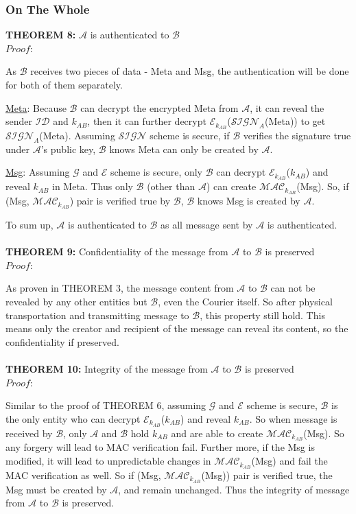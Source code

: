 \documentclass[10pt,a4paper]{article}
\begin{document}
\subsubsection*{On The Whole}
\textbf{THEOREM 8:} $\mathcal{A}$ is authenticated to $\mathcal{B}$ \\
\emph{$Proof:$} \par
As $\mathcal{B}$ receives two pieces of data - Meta and Msg, the authentication will be done for both of them separately.\par
\underline{Meta}: Because $\mathcal{B}$ can decrypt the encrypted Meta from $\mathcal{A}$, it can reveal the sender $\mathcal{ID}$ and $k_{AB}$, then it can further decrypt $\mathcal{E}_{k_{AB}}$($\mathcal{SIGN}_A$(Meta)) to get $\mathcal{SIGN}_A$(Meta). Assuming $\mathcal{SIGN}$ scheme is secure, if $\mathcal{B}$ verifies the signature true under $\mathcal{A}$'s public key, $\mathcal{B}$ knows Meta can only be created by $\mathcal{A}$. \par
\underline{Msg}: Assuming $\mathcal{G}$ and $\mathcal{E}$ scheme is secure, only $\mathcal{B}$ can decrypt $\mathcal{E}_{k_{AB}}$($k_{AB}$) and reveal $k_{AB}$ in Meta. Thus only $\mathcal{B}$ (other than $\mathcal{A}$) can create $\mathcal{MAC}_{k_{AB}}$(Msg). So, if (Msg, $\mathcal{MAC}_{k_{AB}}$) pair is verified true by $\mathcal{B}$, $\mathcal{B}$ knows Msg is created by $\mathcal{A}$. \par
To sum up, $\mathcal{A}$ is authenticated to $\mathcal{B}$ as all message sent by $\mathcal{A}$ is authenticated.
\\
\\
\textbf{THEOREM 9:} Confidentiality of the message from $\mathcal{A}$ to $\mathcal{B}$ is preserved\\
\emph{$Proof:$} \par
As proven in THEOREM 3, the message content from $\mathcal{A}$ to $\mathcal{B}$ can not be revealed by any other entities but $\mathcal{B}$, even the Courier itself. So after physical transportation and transmitting message to $\mathcal{B}$, this property still hold. This means only the creator and recipient of the message can reveal its content, so the confidentiality if preserved.
\\
\\
\textbf{THEOREM 10:} Integrity of the message from $\mathcal{A}$ to $\mathcal{B}$ is preserved\\
\emph{$Proof:$} \par
Similar to the proof of THEOREM 6, assuming $\mathcal{G}$ and $\mathcal{E}$ scheme is secure, $\mathcal{B}$ is the only entity who can decrypt $\mathcal{E}_{k_{AB}}$($k_{AB}$) and reveal $k_{AB}$. So when message is received by $\mathcal{B}$, only $\mathcal{A}$ and $\mathcal{B}$ hold $k_{AB}$ and are able to create $\mathcal{MAC}_{k_{AB}}$(Msg). So any forgery will lead to MAC verification fail. Further more, if the Msg is modified, it will lead to unpredictable changes in $\mathcal{MAC}_{k_{AB}}$(Msg) and fail the MAC verification as well. So if (Msg, $\mathcal{MAC}_{k_{AB}}$(Msg)) pair is verified true, the Msg must be created by $\mathcal{A}$, and remain unchanged. Thus the integrity of message from $\mathcal{A}$ to $\mathcal{B}$ is preserved.
\end{document}
